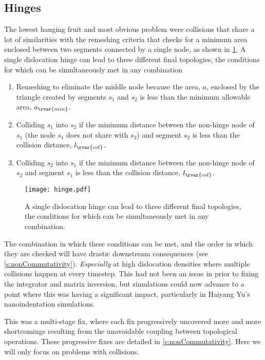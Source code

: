 \subsection{Hinges}\label{ss:hinges}
The lowest hanging fruit and most obvious problem were collisions that share a lot of similarities with the remeshing criteria that checks for a minimum area enclosed between two segments connected by a single node, as shown in \cref{f:hinge}. A single dislocation hinge can lead to three different final topologies, the conditions for which can be simultaneously met in any combination
\begin{enumerate}
    \item Remeshing to eliminate the middle node because the area, $a$, enclosed by the triangle created by segments $s_1$ and $s_2$ is less than the minimum allowable area, $a_{\rvar{min}}$.
    \item Colliding $s_1$ into $s_2$ if the minimum distance between the non-hinge node of $s_1$ (the node $s_1$ does not share with $s_2$) and segment $s_2$ is less than the collision distance, $l_{\rvar{col}}$.
    \item Colliding $s_2$ into $s_1$ if the minimum distance between the non-hinge node of $s_2$ and segment $s_1$ is less than the collision distance, $l_{\rvar{col}}$.
\end{enumerate}
\begin{figure}
    \centering
    \texttt{[image: hinge.pdf]}
    \caption[A single dislocation hinge can lead to three different final topologies.]{A single dislocation hinge can lead to three different final topologies, the conditions for which can be simultaneously met in any combination.}
    \label{f:hinge}
\end{figure}

The combination in which these conditions can be met, and the order in which they are checked will have drastic downstream consequences (see \cref{s:nonCommutativity}). \emph{Especially} at high dislocation densities where multiple collisions happen at every timestep. This had not been an issue in prior to fixing the integrator and matrix inversion, but simulations could now advance to a point where this was having a significant impact, particularly in Haiyang Yu's nanoindentation simulations.

This was a multi-stage fix, where each fix progressively uncovered more and more shortcomings resulting from the unavoidable coupling between topological operations. These progressive fixes are detailed in \cref{s:nonCommutativity}. Here we will only focus on problems with collisions.

